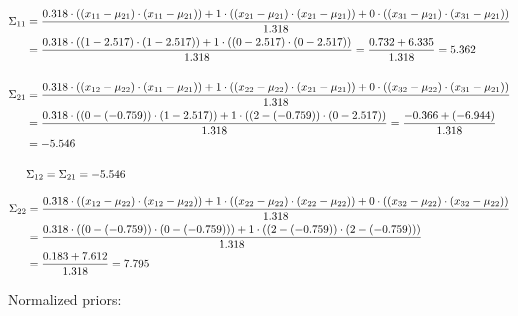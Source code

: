 \documentclass[12pt]{article}
\begin{document}
\begin{enumerate}
\begin{enumerate}[label=\arabic*)]
\begin{itemize}[label=]
    \begin{equation*}
        \fontsize{9.5pt}{10pt}\selectfont
        \begin{aligned}
            \Sigma_{11} &= \frac{0.318 \cdot \left((x_{11}-\mu_{21}) \cdot (x_{11} - \mu_{21})\right)+ 1 \cdot \left((x_{21}-\mu_{21}) \cdot (x_{21} - \mu_{21})\right)+ 0 \cdot \left((x_{31}-\mu_{21}) \cdot (x_{31} - \mu_{21})\right)}{1.318}\\
            &=\frac{0.318 \cdot \left((1-2.517) \cdot (1-2.517)\right) + 1 \cdot \left((0-2.517) \cdot (0 - 2.517)\right)}{1.318} = \frac{0.732+6.335}{1.318} = 5.362\\
            \\
            \Sigma_{21} &= \frac{0.318 \cdot \left((x_{12}-\mu_{22}) \cdot (x_{11} - \mu_{21})\right)+ 1 \cdot \left((x_{22}-\mu_{22}) \cdot (x_{21} - \mu_{21})\right)+ 0 \cdot \left((x_{32}-\mu_{22}) \cdot (x_{31} - \mu_{21})\right)}{1.318}\\
            &=\frac{0.318 \cdot \left((0-(-0.759)) \cdot (1-2.517)\right) + 1 \cdot \left((2-(-0.759)) \cdot (0 - 2.517)\right)}{1.318} = \frac{-0.366+(-6.944)}{1.318} \\
            &= -5.546\\
            \\
            &\Sigma_{12} = \Sigma_{21} = -5.546\\
        \end{aligned}
    \end{equation*}

    \begin{equation*}
        \fontsize{9.5pt}{10pt}\selectfont
        \begin{aligned}
        \Sigma_{22} &= \frac{0.318 \cdot \left((x_{12}-\mu_{22}) \cdot (x_{12} - \mu_{22})\right)+ 1 \cdot \left((x_{22}-\mu_{22}) \cdot (x_{22} - \mu_{22})\right)+ 0 \cdot \left((x_{32}-\mu_{22}) \cdot (x_{32} - \mu_{22})\right)}{1.318}\\
        &= \frac{0.318 \cdot \left((0-(-0.759)) \cdot (0-(-0.759))\right) + 1 \cdot \left((2-(-0.759)) \cdot (2 - (-0.759))\right)}{1.318} \\
        &= \frac{0.183+7.612}{1.318} = 7.795\\
        \end{aligned}
    \end{equation*}

    \end{itemize}

    Normalized priors:


\end{enumerate}
\end{enumerate}
\end{document}
